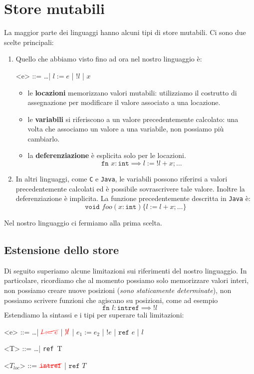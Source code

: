 \section{Store mutabili}
La maggior parte dei linguaggi hanno alcuni tipi di store mutabili. Ci sono due scelte principali:
\begin{enumerate}
    \item Quello che abbiamo visto fino ad ora nel nostro linguaggio è:
    \begin{grammar}
        <e> ::= \dots | $l := e$ | $!l$ | $x$
    \end{grammar}
    \begin{itemize}
        \item le \textbf{locazioni} memorizzano valori mutabili: utilizziamo il
        costrutto di assegnazione per modificare il valore associato a una locazione.
        \item le \textbf{variabili} si riferiscono a un valore precedentemente calcolato: una
        volta che associamo un valore a una variabile, non possiamo più cambiarlo.
        \item la \textbf{deferenziazione} è esplicita solo per le locazioni.
        \[
            \texttt{fn }x : \texttt{int} \implies l := !l + x; \dots
        \]
    \end{itemize}
    \item In altri linguaggi, come \texttt{C} e \texttt{Java}, le variabili possono 
    riferirsi a valori precedentemente calcolati ed è possibile sovrascrivere tale valore. Inoltre 
    la deferenziazione è implicita. La funzione precedentemente descritta in \texttt{Java} è:
    \[
      \texttt{void }foo (x : \texttt{int}) \{ l := l + x; \dots \}
    \]
\end{enumerate}
Nel nostro linguaggio ci fermiamo alla prima scelta.
\subsection{Estensione dello store}
Di seguito superiamo alcune limitazioni sui riferimenti del nostro linguaggio.
In particolare, ricordiamo che al momento possiamo solo memorizzare valori interi,
non possiamo creare nuove posizioni (\textit{sono staticamente determinate}), non possiamo
scrivere funzioni che agiscano su posizioni, 
come ad esempio 
\[
  \texttt{fn }l : \texttt{intref} \implies !l  
\]
Estendiamo la sintassi e i tipi per superare tali limitazioni:
\begin{grammar}
    <e> ::= \dots | $\textcolor{red}{\cancel{l:=e}}$ |  $\textcolor{red}{\cancel{!l}}$ | 
    $e_1 := e_2$ | $!e$ | ${\texttt{ref }e}$ | $l$

    <T> ::= \dots | \texttt{ref }T

    <$T_{loc}$> ::= $\textcolor{red}{\cancel{\texttt{intref}}}$ | $\texttt{ref }T$
\end{grammar}
